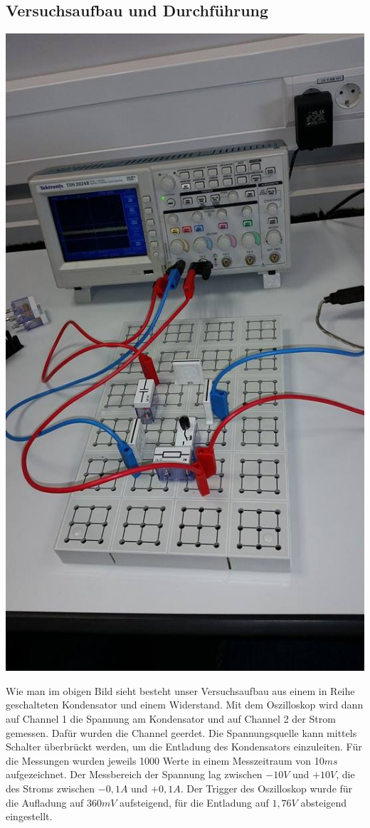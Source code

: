 \documentclass[12pt,a4paper]{article}
\begin{document}
\subsection{Versuchsaufbau und Durchführung}
\begin{center}
\includegraphics[scale=0.6]{12834525_1207198235971903_753892727_n.jpg}
\end{center}
Wie man im obigen Bild sieht besteht unser Versuchsaufbau aus einem in Reihe geschalteten Kondensator und einem Widerstand. Mit dem Oszilloskop wird dann auf Channel 1 die Spannung am Kondensator und auf Channel 2 der Strom gemessen. Dafür wurden die Channel geerdet.
Die Spannungsquelle kann mittels Schalter überbrückt werden, um die Entladung des Kondensators einzuleiten.
Für die Messungen wurden jeweils 1000 Werte in einem Messzeitraum von 10$ms$ aufgezeichnet. Der Messbereich der Spannung lag zwischen $-10V$ und $+10V$, die des Stroms zwischen $-0,1A$ und $+0,1A$.
Der Trigger des Oszilloskop wurde für die Aufladung auf $360mV$ aufsteigend, für die Entladung auf $1,76V$ absteigend eingestellt.
\end{document}
